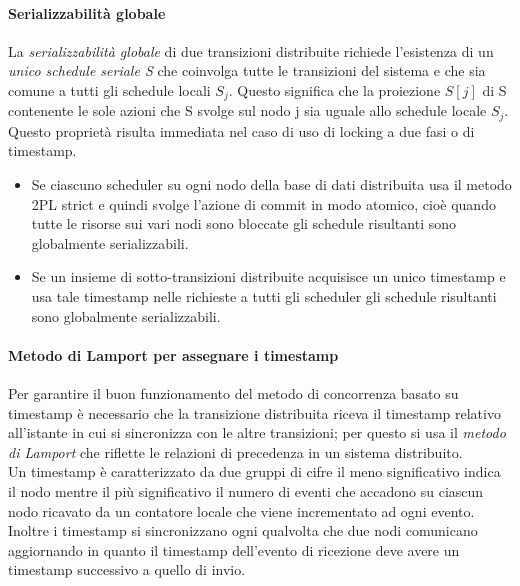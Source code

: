 \paragraph{Serializzabilità globale} La \emph{serializzabilità globale} di due transizioni distribuite richiede l'esistenza di un \emph{unico schedule seriale S} che coinvolga tutte le transizioni del sistema e che sia comune a tutti gli schedule locali $S_j$. Questo significa che la proiezione $S[j]$ di S contenente le sole azioni che S svolge sul nodo j sia uguale allo schedule locale $S_j$.\\
Questo proprietà risulta immediata nel caso di uso di locking a due fasi o di timestamp.
\begin{itemize}
\item Se ciascuno scheduler su ogni nodo della base di dati distribuita usa il metodo 2PL strict e quindi svolge l'azione di commit in modo atomico, cioè quando tutte le risorse sui vari nodi sono bloccate gli schedule risultanti sono globalmente serializzabili.
\item Se un insieme di sotto-transizioni distribuite acquisisce un unico timestamp e usa tale timestamp nelle richieste a tutti gli scheduler gli schedule risultanti sono globalmente serializzabili.
\end{itemize}
\paragraph{Metodo di Lamport per assegnare i timestamp} Per garantire il buon funzionamento del metodo di concorrenza basato su timestamp è necessario che la transizione distribuita riceva il timestamp relativo all'istante in cui si sincronizza con le altre transizioni; per questo si usa il \emph{metodo di Lamport} che riflette le relazioni di precedenza in un sistema distribuito.\\
Un timestamp è caratterizzato da due gruppi di cifre il meno significativo indica il nodo mentre il più significativo il numero di eventi che accadono su ciascun nodo ricavato da un contatore locale che viene incrementato ad ogni evento.\\
Inoltre i timestamp si sincronizzano ogni qualvolta che due nodi comunicano aggiornando in quanto il timestamp dell'evento di ricezione deve avere un timestamp successivo a quello di invio.
